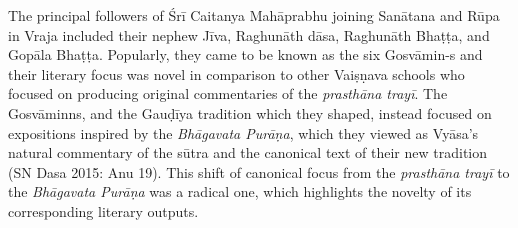 The principal followers of Śrī Caitanya Mahāprabhu joining Sanātana and Rūpa in Vraja included their nephew Jīva, Raghunāth dāsa, Raghunāth Bhaṭṭa, and Gopāla Bhaṭṭa. Popularly, they came to be known as the six Gosvāmin-s and their literary focus was novel in comparison to other Vaiṣṇava schools who focused on producing original commentaries of the {\sl prasthāna trayī}. The Gosvāminns, and the Gauḍīya tradition which they shaped, instead focused on expositions inspired by the {\sl Bhāgavata Purāṇa}, which they viewed as Vyāsa’s natural commentary of the sūtra and the canonical text of their new tradition (SN Dasa 2015: Anu 19). This shift of canonical focus from the {\sl prasthāna trayī} to the {\sl Bhāgavata Purāṇa} was a radical one, which highlights the novelty of its corresponding literary outputs. 

